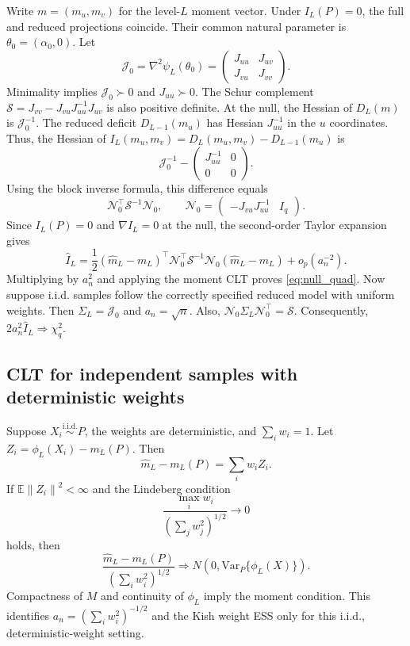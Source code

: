 \documentclass[twoside]{article}
\theoremstyle{definition}
\theoremstyle{remark}
\newcommand{\E}{\mathbb E}
\newcommand{\norm}[1]{\left\lVert #1\right\rVert}
\begin{document}
Write $m=(m_u,m_v)$ for the level-$L$ moment vector. Under $I_L(P)=0$, the full and reduced projections coincide. Their common natural parameter is $\theta_0=(\alpha_0,0)$. Let
\[
  \mathcal J_0=\nabla^2\psi_L(\theta_0)=
  \begin{pmatrix}J_{uu}&J_{uv}\\J_{vu}&J_{vv}\end{pmatrix}.
\]
Minimality implies $\mathcal J_0\succ0$ and $J_{uu}\succ0$. The Schur complement $\mathcal S=J_{vv}-J_{vu}J_{uu}^{-1}J_{uv}$ is also positive definite. At the null, the Hessian of $D_L(m)$ is $\mathcal J_0^{-1}$. The reduced deficit $D_{L-1}(m_u)$ has Hessian $J_{uu}^{-1}$ in the $u$ coordinates. Thus, the Hessian of $I_L(m_u,m_v)=D_L(m_u,m_v)-D_{L-1}(m_u)$ is
\[
  \mathcal J_0^{-1}-
  \begin{pmatrix}J_{uu}^{-1}&0\\0&0\end{pmatrix}.
\]
Using the block inverse formula, this difference equals
\[
  \mathcal{N}_0^\top \mathcal S^{-1}\mathcal{N}_0,
  \qquad
  \mathcal{N}_0=\begin{pmatrix}-J_{vu}J_{uu}^{-1}&I_q\end{pmatrix}.
\]
Since $I_L(P)=0$ and $\nabla I_L=0$ at the null, the second-order Taylor expansion gives
\[
  \widehat I_L=\frac12(\widehat m_L-m_L)^\top \mathcal{N}_0^\top \mathcal S^{-1}\mathcal{N}_0(\widehat m_L-m_L)+o_p(a_n^{-2}).
\]
Multiplying by $a_n^2$ and applying the moment CLT proves \eqref{eq:null_quad}. Now suppose i.i.d. samples follow the correctly specified reduced model with uniform weights. Then $\Sigma_L=\mathcal J_0$ and $a_n=\sqrt n$. Also, $\mathcal{N}_0\Sigma_L\mathcal{N}_0^\top=\mathcal S$. Consequently, $2a_n^2\widehat I_L\Rightarrow\chi_q^2$.

\subsection{CLT for independent samples with deterministic weights}

Suppose $X_i\overset{\mathrm{i.i.d.}}\sim P$, the weights are deterministic, and $\sum_iw_i=1$. Let $Z_i=\phi_L(X_i)-m_L(P)$. Then
\[
  \widehat m_L-m_L(P)=\sum_iw_iZ_i.
\]
If $\E\norm{Z_i}^2<\infty$ and the Lindeberg condition
\[
  \frac{\max_iw_i}{(\sum_jw_j^2)^{1/2}}\to0
\]
holds, then
\[
  \frac{\widehat m_L-m_L(P)}{(\sum_iw_i^2)^{1/2}}
  \Rightarrow N(0,\mathrm{Var}_P\{\phi_L(X)\}).
\]
Compactness of $M$ and continuity of $\phi_L$ imply the moment condition. This identifies $a_n=(\sum_iw_i^2)^{-1/2}$ and the Kish weight ESS only for this i.i.d., deterministic-weight setting.
\end{document}
